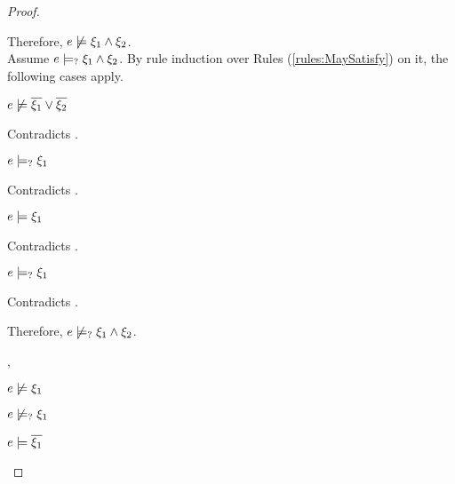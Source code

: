\begin{proof}
\begin{byCases}
\begin{byCases}
        Therefore, $e \not\models \xi_1 \wedge \xi_2$.\\
        Assume $e \models_{?} \xi_1 \wedge \xi_2$. By rule induction over Rules (\ref{rules:MaySatisfy}) on it, the following cases apply.
        \begin{byCases}
        \item[\text{(\ref{rule:CMSNotVal})}]
            \begin{pfsteps*}
            \item $e \not\models \overline{\xi_1} \vee \overline{\xi_2}$ 
            \end{pfsteps*}
            Contradicts .
        \item[\text{(\ref{rule:CMSAnd1})}]
            \begin{pfsteps*}
            \item $e \models_{?} \xi_1$ 
            \end{pfsteps*}
            Contradicts .
        \item[\text{(\ref{rule:CMSAnd2})}]
            \begin{pfsteps*}
            \item $e \models \xi_1$ 
            \end{pfsteps*}
            Contradicts .
        \item[\text{(\ref{rule:CMSAnd3})}]
            \begin{pfsteps*}
            \item $e \models_{?} \xi_1$ 
            \end{pfsteps*}
            Contradicts .
        \end{byCases}
        Therefore, $e \not\models_{?} \xi_1 \wedge \xi_2$.
    \item[\csatisfy{e}{\cdual{\xi_1}},\csatisfy{e}{\cdual{\xi_2}}]
        \begin{pfsteps*}
        \item $e \not\models \xi_1$  
        \item $e \not\models_{?} \xi_1$  
        \item $e \models \overline{\xi_1}$  

\end{pfsteps*}
\end{byCases}
\end{byCases}
\end{proof}
